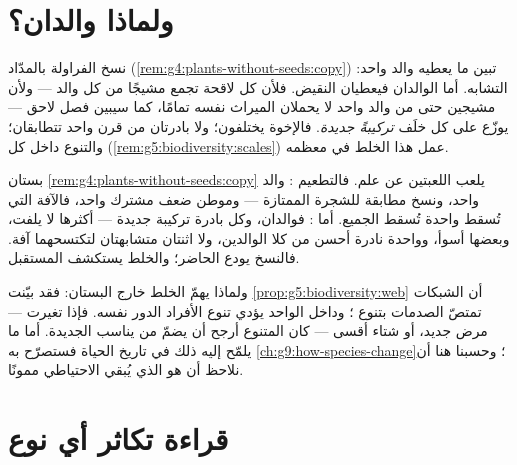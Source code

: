 \section{ولماذا والدان؟}

\begin{proposition}\label{prop:g8:sexual-reproduction:shuffle}
نسخ الفراولة بالمدّاد
(\cref{rem:g4:plants-without-seeds:copy}) تبين ما يعطيه والد واحد:
التشابه. أما الوالدان فيعطيان النقيض. فلأن كل لاقحة تجمع مشيجًا من
كل والد --- ولأن مشيجين حتى من والد واحد لا يحملان الميراث نفسه
تمامًا، كما سيبين فصل لاحق --- يوزّع  على كل خلَف
\emph{تركيبةً جديدة}. فالإخوة يختلفون؛ ولا بادرتان من قرن واحد
تتطابقان؛ والتنوع داخل كل 
(\cref{rem:g5:biodiversity:scales}) عمل هذا الخلط في معظمه.
\end{proposition}
\admitted

\begin{example}\label{ex:g8:sexual-reproduction:bets}
بستان \cref{rem:g4:plants-without-seeds:copy} يلعب اللعبتين عن
علم. فالتطعيم : والد واحد، ونسخ مطابقة للشجرة الممتازة ---
وموطن ضعف مشترك واحد، فالآفة التي تُسقط واحدة تُسقط الجميع. أما
: فوالدان، وكل بادرة تركيبة جديدة --- أكثرها لا يلفت، وبعضها
أسوأ، وواحدة نادرة أحسن من كلا الوالدين، ولا اثنتان متشابهتان
لتكتسحهما آفة. فالنسخ يودع الحاضر؛ والخلط يستكشف المستقبل.
\end{example}

\begin{remark}\label{rem:g8:sexual-reproduction:reserve}
ولماذا يهمّ الخلط خارج البستان: فقد بيّنت
\cref{prop:g5:biodiversity:web} أن الشبكات تمتصّ الصدمات بتنوع
؛ وداخل  الواحد يؤدي تنوع الأفراد الدور نفسه. فإذا
تغيرت  --- مرض جديد، أو شتاء أقسى --- كان  المتنوع أرجح
أن يضمّ من يناسب  الجديدة. أما ما يلمّح إليه ذلك في تاريخ
الحياة فستصرّح به \cref{ch:g9:how-species-change}؛ وحسبنا هنا أن
نلاحظ أن  هو الذي يُبقي الاحتياطي ممونًا.
\end{remark}

\section{قراءة تكاثر أي نوع}

